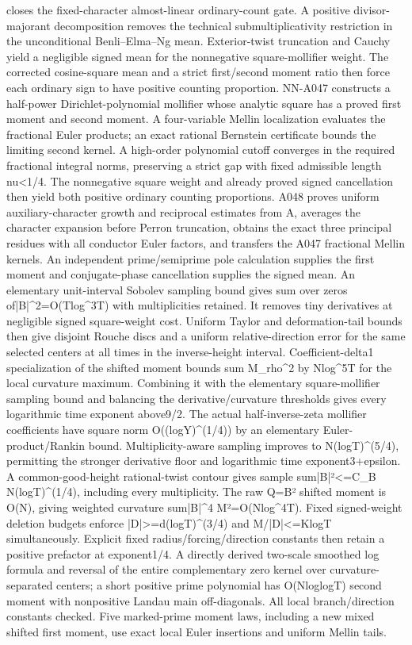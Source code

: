 closes the fixed-character almost-linear ordinary-count gate. A positive divisor-majorant decomposition removes the technical submultiplicativity restriction in the unconditional Benli--Elma--Ng mean. Exterior-twist truncation and Cauchy yield a negligible signed mean for the nonnegative square-mollifier weight. The corrected cosine-square mean and a strict first/second moment ratio then force each ordinary sign to have positive counting proportion. NN-A047 constructs a half-power Dirichlet-polynomial mollifier whose analytic square has a proved first moment and second moment. A four-variable Mellin localization evaluates the fractional Euler products; an exact rational Bernstein certificate bounds the limiting second kernel. A high-order polynomial cutoff converges in the required fractional integral norms, preserving a strict gap with fixed admissible length nu<1/4. The nonnegative square weight and already proved signed cancellation then yield both positive ordinary counting proportions. A048 proves uniform auxiliary-character growth and reciprocal estimates from A, averages the character expansion before Perron truncation, obtains the exact three principal residues with all conductor Euler factors, and transfers the A047 fractional Mellin kernels. An independent prime/semiprime pole calculation supplies the first moment and conjugate-phase cancellation supplies the signed mean. An elementary unit-interval Sobolev sampling bound gives sum over zeros of|B|\textasciicircum{}2=O(Tlog\textasciicircum{}3T) with multiplicities retained. It removes tiny derivatives at negligible signed square-weight cost. Uniform Taylor and deformation-tail bounds then give disjoint Rouche discs and a uniform relative-direction error for the same selected centers at all times in the inverse-height interval. Coefficient-delta1 specialization of the shifted moment bounds sum M\_rho\textasciicircum{}2 by Nlog\textasciicircum{}5T for the local curvature maximum. Combining it with the elementary square-mollifier sampling bound and balancing the derivative/curvature thresholds gives every logarithmic time exponent above9/2. The actual half-inverse-zeta mollifier coefficients have square norm O((logY)\textasciicircum{}(1/4)) by an elementary Euler-product/Rankin bound. Multiplicity-aware sampling improves to N(logT)\textasciicircum{}(5/4), permitting the stronger derivative floor and logarithmic time exponent3+epsilon. A common-good-height rational-twist contour gives sample sum|B|²<=C\_B N(logT)\textasciicircum{}(1/4), including every multiplicity. The raw Q=B² shifted moment is O(N), giving weighted curvature sum|B|\textasciicircum{}4 M²=O(Nlog\textasciicircum{}4T). Fixed signed-weight deletion budgets enforce |D|>=d(logT)\textasciicircum{}(3/4) and M/|D|<=KlogT simultaneously. Explicit fixed radius/forcing/direction constants then retain a positive prefactor at exponent1/4. A directly derived two-scale smoothed log formula and reversal of the entire complementary zero kernel over curvature-separated centers; a short positive prime polynomial has O(NloglogT) second moment with nonpositive Landau main off-diagonals. All local branch/direction constants checked. Five marked-prime moment laws, including a new mixed shifted first moment, use exact local Euler insertions and uniform Mellin tails. 